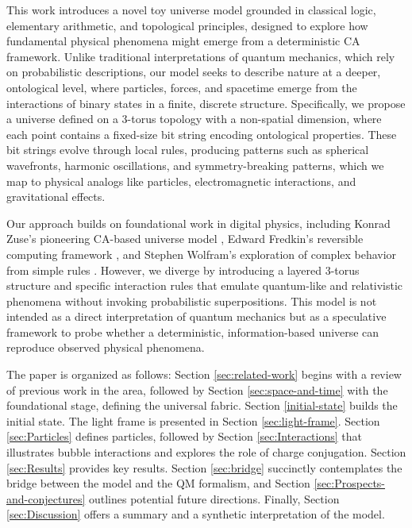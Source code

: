 \documentclass[12pt,english]{article}
\begin{document}
This work introduces a novel toy universe model grounded in classical logic, elementary arithmetic, and topological principles, designed to explore how fundamental physical phenomena might emerge from a deterministic CA framework. Unlike traditional interpretations of quantum mechanics, which rely on probabilistic descriptions, our model seeks to describe nature at a deeper, ontological level, where particles, forces, and spacetime emerge from the interactions of binary states in a finite, discrete structure. Specifically, we propose a universe defined on a 3-torus topology with a non-spatial dimension, where each point contains a fixed-size bit string encoding ontological properties. These bit strings evolve through local rules, producing patterns such as spherical wavefronts, harmonic oscillations, and symmetry-breaking patterns, which we map to physical analogs like particles, electromagnetic interactions, and gravitational effects.

Our approach builds on foundational work in digital physics, including Konrad Zuse’s pioneering CA-based universe model \cite{zuse}, Edward Fredkin’s reversible computing framework \cite{fredkin}, and Stephen Wolfram’s exploration of complex behavior from simple rules \cite{wolfram}. However, we diverge by introducing a layered 3-torus structure and specific interaction rules that emulate quantum-like and relativistic phenomena without invoking probabilistic superpositions. This model is not intended as a direct interpretation of quantum mechanics but as a speculative framework to probe whether a deterministic, information-based universe can reproduce observed physical phenomena.

The paper is organized as follows: Section \ref{sec:related-work} begins with a review of previous work in the area, followed by Section \ref{sec:space-and-time} with the foundational stage, defining the universal fabric. Section \ref{initial-state} builds the initial state. The light frame is presented in Section \ref{sec:light-frame}. Section \ref{sec:Particles} defines particles, followed by Section \ref{sec:Interactions} that illustrates bubble interactions and explores the role of charge conjugation. Section \ref{sec:Results} provides key results. Section \ref{sec:bridge} succinctly contemplates the bridge between the model and the QM formalism, and Section \ref{sec:Prospects-and-conjectures} outlines potential future directions. Finally, Section \ref{sec:Discussion} offers a summary and a synthetic interpretation of the model.
\end{document}
